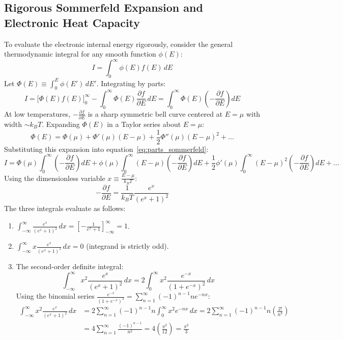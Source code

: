 \documentclass[11pt,a4paper]{article}
\begin{document}
\subsection{Rigorous Sommerfeld Expansion and Electronic Heat Capacity}
To evaluate the electronic internal energy rigorously, consider the general thermodynamic integral for any smooth function $\phi(E)$:
\begin{equation}
I = \int_0^\infty \phi(E) f(E)\,dE
\end{equation}
Let $\Phi(E) \equiv \int_0^E \phi(E')\,dE'$. Integrating by parts:
\begin{equation}
I = \Big[ \Phi(E)f(E) \Big]_0^\infty - \int_0^\infty \Phi(E)\frac{\partial f}{\partial E}\,dE = \int_0^\infty \Phi(E)\left(-\frac{\partial f}{\partial E}\right)dE
\label{eq:parts_sommerfeld}
\end{equation}
At low temperatures, $-\frac{\partial f}{\partial E}$ is a sharp symmetric bell curve centered at $E = \mu$ with width $\sim k_B T$. Expanding $\Phi(E)$ in a Taylor series about $E = \mu$:
\begin{equation}
\Phi(E) = \Phi(\mu) + \Phi'(\mu)(E-\mu) + \frac{1}{2}\Phi''(\mu)(E-\mu)^2 + \dots
\end{equation}
Substituting this expansion into equation~\eqref{eq:parts_sommerfeld}:
\begin{equation}
I = \Phi(\mu)\int_0^\infty \left(-\frac{\partial f}{\partial E}\right)dE + \phi(\mu)\int_0^\infty (E-\mu)\left(-\frac{\partial f}{\partial E}\right)dE + \frac{1}{2}\phi'(\mu)\int_0^\infty (E-\mu)^2\left(-\frac{\partial f}{\partial E}\right)dE + \dots
\end{equation}
Using the dimensionless variable $x \equiv \frac{E-\mu}{k_B T}$:
\begin{equation}
-\frac{\partial f}{\partial E} = \frac{1}{k_B T}\frac{e^x}{(e^x+1)^2}
\end{equation}
The three integrals evaluate as follows:
\begin{enumerate}
    \item $\int_{-\infty}^\infty \frac{e^x}{(e^x+1)^2}\,dx = \left[ -\frac{1}{e^x+1} \right]_{-\infty}^\infty = 1$.
    \item $\int_{-\infty}^\infty x \frac{e^x}{(e^x+1)^2}\,dx = 0$ (integrand is strictly odd).
    \item The second-order definite integral:
    \begin{equation}
    \int_{-\infty}^\infty x^2 \frac{e^x}{(e^x+1)^2}\,dx = 2\int_0^\infty x^2 \frac{e^{-x}}{(1+e^{-x})^2}\,dx
    \end{equation}
    Using the binomial series $\frac{e^{-x}}{(1+e^{-x})^2} = \sum_{n=1}^\infty (-1)^{n-1} n e^{-nx}$:
    \begin{align}
    \int_{-\infty}^\infty x^2 \frac{e^x}{(e^x+1)^2}\,dx &= 2\sum_{n=1}^\infty (-1)^{n-1} n \int_0^\infty x^2 e^{-nx}\,dx = 2\sum_{n=1}^\infty (-1)^{n-1} n \left(\frac{2!}{n^3}\right) \nonumber \\
    &= 4\sum_{n=1}^\infty \frac{(-1)^{n-1}}{n^2} = 4\left( \frac{\pi^2}{12} \right) = \frac{\pi^2}{3}
    \label{eq:definite_integral_pi2_3}
    \end{align}
\end{enumerate}
\end{document}
